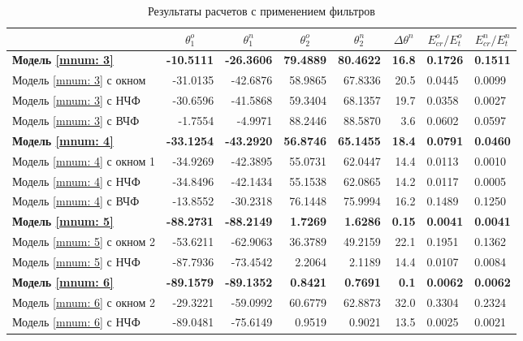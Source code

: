 \begin{table}
\footnotesize
\centering
\caption{Результаты расчетов с применением фильтров}
\renewcommand{\arraystretch}{1.5}
\begin{tabularx}{\textwidth}{X|rr|rr|r|ll}
				&\multicolumn{1}{c}{$\theta_1^o$} & \multicolumn{1}{c|}{$\theta_1^n$} & \multicolumn{1}{c}{$\theta_2^o$} & \multicolumn{1}{c|}{$\theta_2^n$} & \multicolumn{1}{c|}{$\Delta\theta^n$}& \multicolumn{1}{c}{$E_{cr}^o/E_{t}^o$} & \multicolumn{1}{c}{$E_{cr}^n/E_{t}^n$} \\ \hline
\hline  \textbf{Модель \ref{mnum: 3}}	& \textbf{-10.5111} & \textbf{-26.3606} & \textbf{79.4889} & \textbf{80.4622} & \textbf{16.8} & \textbf{0.1726} & \textbf{0.1511} \\
		Модель \ref{mnum: 3} с окном  	& -31.0135 & -42.6876 & 58.9865 & 67.8336 & 20.5 & 0.0445 & 0.0099 \\
	    Модель \ref{mnum: 3} с НЧФ 		& -30.6596 & -41.5868 & 59.3404 & 68.1357 & 19.7 & 0.0358 & 0.0027 \\
 	    Модель \ref{mnum: 3} с ВЧФ 		& -1.7554  & -4.9971  & 88.2446 & 88.5870 & 3.6  & 0.0602 & 0.0597 \\ 	   
\hline  \textbf{Модель \ref{mnum: 4}}	& \textbf{-33.1254} & \textbf{-43.2920} & \textbf{56.8746} & \textbf{65.1455} & \textbf{18.4} & \textbf{0.0791} & \textbf{0.0460} \\
		Модель \ref{mnum: 4} с окном 1 	& -34.9269 & -42.3895 & 55.0731 & 62.0447 & 14.4 & 0.0113 & 0.0010 \\
	    Модель \ref{mnum: 4} с НЧФ 		& -34.8496 & -42.1434 & 55.1538 & 62.0865 & 14.2 & 0.0117 & 0.0005 \\
 	    Модель \ref{mnum: 4} с ВЧФ 		& -13.8552 & -30.2318 & 76.1448 & 75.9994 & 16.2 & 0.1489 & 0.1250 \\ 
\hline  \textbf{Модель \ref{mnum: 5}} 	& \textbf{-88.2731} & \textbf{-88.2149} & \textbf{1.7269} & \textbf{1.6286} & \textbf{0.15} & \textbf{0.0041} & \textbf{0.0041} \\
		Модель \ref{mnum: 5} с окном 2  & -53.6211 & -62.9063 & 36.3789 & 49.2159 & 22.1 & 0.1951 & 0.1362 \\
	    Модель \ref{mnum: 5} с НЧФ  	& -87.7936 & -73.4542 & 2.2064 & 2.1189 & 14.4 & 0.0107 & 0.0084 \\
\hline  \textbf{Модель \ref{mnum: 6}} 	& \textbf{-89.1579} & \textbf{-89.1352} & \textbf{0.8421} & \textbf{0.7691} & \textbf{0.1} & \textbf{0.0062} & \textbf{0.0062} \\
		Модель \ref{mnum: 6} с окном 2 	& -29.3221 & -59.0992 & 60.6779 & 62.8873 & 32.0 & 0.3304 & 0.2324 \\
	    Модель \ref{mnum: 6} с НЧФ 		& -89.0481 & -75.6149 & 0.9519 & 0.9021 & 13.5 & 0.0025 & 0.0021 \\ \hline	   	       	    
\end{tabularx} 
\renewcommand{\arraystretch}{1.0}
\end{table}